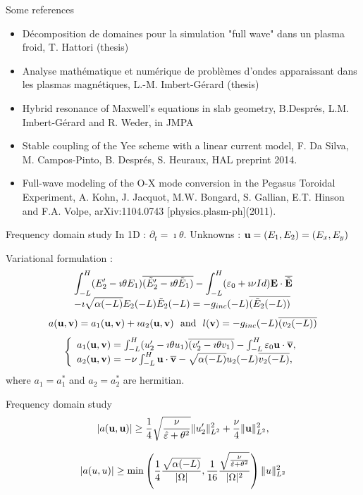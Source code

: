 \begin{frame}{Some references}
\begin{itemize}
\item Décomposition de domaines pour la simulation "full wave" dans un plasma froid, T. Hattori (thesis) \\ 
\item Analyse mathématique et numérique de problèmes d’ondes apparaissant dans les plasmas
magnétiques, L.-M. Imbert-Gérard (thesis)\\ 
\item Hybrid resonance of Maxwell's equations in slab geometry, B.Després, L.M. Imbert-Gérard and R. Weder, in JMPA\\ 
\item  Stable coupling of the Yee scheme with a linear current model, F. Da Silva, M. Campos-Pinto, B. Després, S. Heuraux, HAL preprint 2014. \\ 
\item Full-wave modeling of the O-X mode conversion in the Pegasus Toroidal Experiment, A. Kohn, J. Jacquot, M.W. Bongard, S. Gallian, E.T. Hinson and F.A. Volpe, arXiv:1104.0743 [physics.plasm-ph](2011).
\end{itemize}
\end{frame}
\begin{frame}{Frequency domain study}
In 1D : $\partial_t = \imath \theta$. Unknowns : ${\bf u} =(E_1,E_2) = (E_x,E_y)$


\alert{Variational formulation :}
\[
\begin{array}{l}
\displaystyle \int_{-L}^H (E_2' -\imath\theta E_1)\overline{(\tilde E_2' -\imath \theta \tilde E_1)} - \int_{-L}^H ({\bf \varepsilon}_0 +\imath\nu Id) {\bf E} \cdot \overline{\tilde {{\bf E}}}
\\ \displaystyle  - \imath \sqrt{\alpha(-L)} E_2 (-L) \tilde E_2 (-L) = -g_{inc} (-L) \overline{( \tilde E_2(-L) )} 
\end{array}
\]
\[
a({\bf u},{\bf v}) = a_1 ({\bf u},{\bf v}) +\imath a_2({\bf u},{\bf v})\  \text{ and } \  l({\bf v}) = -g_{inc} (-L) \overline{(v_2(-L) )} 
\]
\[
\left\{\begin{array}{l}
a_1({\bf u},{\bf v}) = \int_{-L}^H (u_2' -\imath\theta u_1)\overline{(v_2' -\imath \theta v_1)} - \int_{-L}^H {\bf \varepsilon}_0 {\bf u}\cdot \overline{{\bf v}}, 
\\ a_2({\bf u},{\bf v}) = -\nu \int_{-L}^H  {\bf u}\cdot \overline{{\bf v}} -  \sqrt{\alpha(-L)} u_2 (-L) \overline{v_2 (-L)} , 
\end{array}\right.
\]
where $a_1= a_1^*$ and $a_2=a_2^*$ are hermitian.
\end{frame}
\begin{frame}{Frequency domain study}
\[
|a({\bf u},{\bf u})| \geq \frac{1}{4} \sqrt{\frac{\nu}{{\hat{{\bf \varepsilon}}} + \theta^2}}\|u_2'\|^2_{L^2} +  \frac{\nu}{4} \|{\bf u}\|_{L^2}^2,
\]
\begin{block}{}
\[
|a(u,u)| \geq \min\left(\frac{1}{4} \frac{\sqrt{\alpha(-L)}}{|\Omega|} , \frac{1}{16}\frac{\sqrt{\frac{\nu}{{\hat{{\bf \varepsilon}}} + \theta^2}}}{|\Omega|^2}\right) \|u\|^2_{L^2}
\]
\end{block}
\end{frame}

